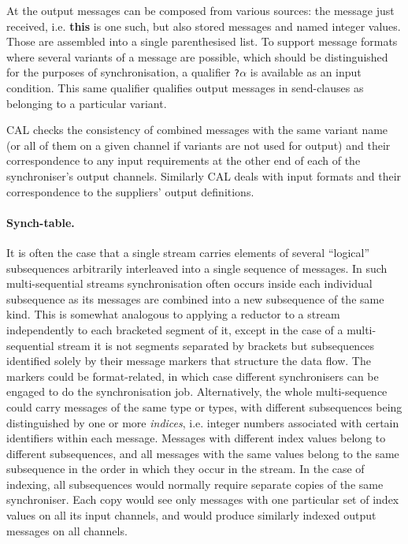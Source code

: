 \documentclass[11pt]{report}
\begin{document}
At the output messages can be composed from various sources: the message just received, i.e. {\bf this} is one such, but also stored messages and named integer values. Those are assembled into a single parenthesised list. To support message formats where several variants of a message are possible, which should be distinguished for the purposes of synchronisation, a qualifier \verb"?"$\alpha$ is available as an input condition. This same qualifier qualifies output messages in send-clauses as belonging to a particular variant.

CAL checks the consistency of combined messages with the same variant name (or all of them on a given channel if variants are not used for output) and their correspondence to any input requirements at the other end of each of the synchroniser's output channels. Similarly CAL deals with input formats and their correspondence to the suppliers' output definitions.

\paragraph{Synch-table.}It is often the case that a single stream carries elements of several ``logical'' subsequences arbitrarily interleaved into a single sequence of messages. In such multi-sequential streams synchronisation often occurs inside each individual subsequence as its messages are combined   into a new subsequence of the same kind. This is somewhat analogous to applying a reductor to a stream independently to each bracketed segment of it, except in the case of a multi-sequential stream it is not segments separated by brackets but subsequences identified solely by their message markers that structure the data flow. The markers could be format-related, in which case different synchronisers can be engaged to do the synchronisation job. Alternatively, the whole multi-sequence could carry messages of the same type or types, with different subsequences being distinguished by one or more {\em indices}, i.e. integer numbers associated with certain identifiers within each message. Messages with different index values belong to different subsequences, and all messages with the same values belong to the same subsequence in the order in which they occur in the stream. In the case of indexing, all subsequences would normally require separate copies of the same synchroniser. Each copy would see only messages with one particular set of index values on all its input channels, and would produce similarly indexed output messages on all channels.
\end{document}
